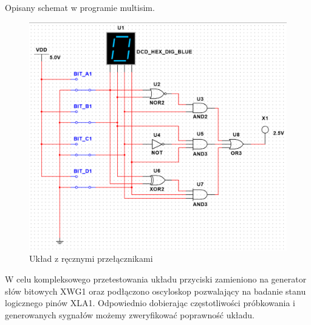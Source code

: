 \documentclass[12pt,a4paper,openright]{mwrep}
\begin{document}
Opisany schemat w programie multisim.
\begin{figure}[H]
    \centering
    \includegraphics[width=1\textwidth]{images/1b_schema_1.PNG}
    \caption{Układ z ręcznymi przełącznikami}
    \label{rys:1b_usable_circuit}
\end{figure}

W celu kompleksowego przetestowania układu przyciski zamieniono na generator słów bitowych XWG1 
oraz podłączono oscyloskop pozwalający na badanie stanu logicznego pinów XLA1.
Odpowiednio dobierając częstotliwości próbkowania i generowanych sygnałów możemy zweryfikować poprawność układu.
\end{document}
